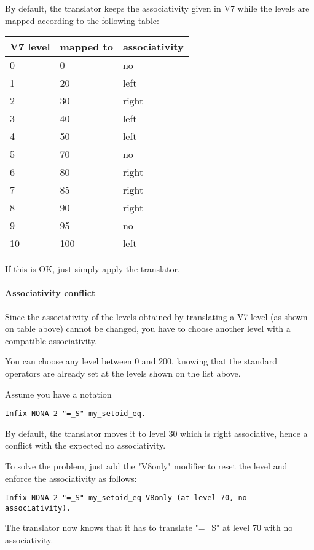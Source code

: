 \documentclass[11pt,a4paper]{article}
\begin{document}
  By default, the translator keeps the associativity given in V7 while
the levels are mapped according to the following table:
 
\begin{center}
\begin{tabular}{l|l|l}
V7 level & mapped to & associativity \\
\hline
0 & 0 & no \\
1 & 20 & left \\
2 & 30 & right \\
3 & 40 & left \\
4 & 50 & left \\
5 & 70 & no \\
6 & 80 & right \\
7 & 85 & right \\
8 & 90 & right \\
9 & 95 & no \\
10 & 100 & left
\end{tabular}
\end{center}

If this is OK, just simply apply the translator.


\paragraph{Associativity conflict}

  Since the associativity of the levels obtained by translating a V7
level (as shown on table above) cannot be changed, you have to choose
another level with a compatible associativity.

  You can choose any level between 0 and 200, knowing that the
standard operators are already set at the levels shown on the list
above. 

Assume you have a notation
\begin{verbatim}
Infix NONA 2 "=_S" my_setoid_eq.
\end{verbatim}
By default, the translator moves it to level 30 which is right
associative, hence a conflict with the expected no associativity.

To solve the problem, just add the "V8only" modifier to reset the
level and enforce the associativity as follows:
\begin{verbatim}
Infix NONA 2 "=_S" my_setoid_eq V8only (at level 70, no associativity).
\end{verbatim}
The translator now knows that it has to translate "=_S" at level 70
with no associativity.
\end{document}
